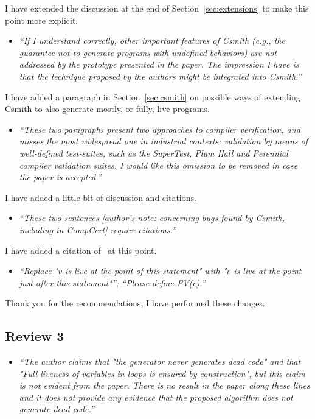 \documentclass{llncs}
\begin{document}
I have extended the discussion at the end of Section~\ref{sec:extensions} to
make this point more explicit.

\begin{itemize}\item
\emph{``If I understand correctly, other important features of Csmith
(e.g., the guarantee not to generate programs with undefined behaviors)
are not addressed by the prototype presented in the paper.
The impression I have is that the technique proposed by the authors
might be integrated into Csmith.''}
\end{itemize}

I have added a paragraph in Section~\ref{sec:csmith} on possible ways of
extending Csmith to also generate mostly, or fully, live programs.

\begin{itemize}\item
\emph{``These two paragraphs present two approaches to compiler
verification,
and misses the most widespread one in industrial contexts: validation
by means of well-defined test-suites, such as the SuperTest, Plum Hall
and Perennial compiler validation suites.  I would like this omission
to be removed in case the paper is accepted.''}
\end{itemize}

I have added a little bit of discussion and citations.

\begin{itemize}\item
\emph{``These two sentences [author's note: concerning bugs found by Csmith,
including in CompCert] require citations.''}
\end{itemize}

I have added a citation of~\cite{csmith-2011} at this point.

\begin{itemize}\item
\emph{``Replace "$v$ is live at the point of this statement" with    "$v$ is
live at the point just after this statement"''; ``Please define FV(e).''}
\end{itemize}

Thank you for the recommendations, I have performed these changes.


\subsection{Review 3}

\begin{itemize}\item
\emph{``The author claims that "the generator never generates dead code" and
that "Full liveness of variables in loops is ensured by construction", but
this claim is not evident from the paper. There is no result in the paper
along these lines and it does not provide any evidence that the proposed
algorithm does not generate dead code.''}
\end{itemize}
\end{document}
